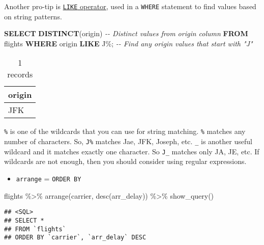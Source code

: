 \documentclass[
]{book}
\newenvironment{Shaded}{\begin{snugshade}}{\end{snugshade}}
\newcommand{\CommentTok}[1]{\textcolor[rgb]{0.56,0.35,0.01}{\textit{#1}}}
\newcommand{\FunctionTok}[1]{\textcolor[rgb]{0.00,0.00,0.00}{#1}}
\newcommand{\KeywordTok}[1]{\textcolor[rgb]{0.13,0.29,0.53}{\textbf{#1}}}
\newcommand{\NormalTok}[1]{#1}
\newcommand{\SpecialCharTok}[1]{\textcolor[rgb]{0.00,0.00,0.00}{#1}}
\newcommand{\StringTok}[1]{\textcolor[rgb]{0.31,0.60,0.02}{#1}}
\providecommand{\tightlist}{%
  \setlength{\itemsep}{0pt}\setlength{\parskip}{0pt}}
\begin{document}
Another pro-tip is \href{https://www.w3schools.com/sql/sql_like.asp}{\texttt{LIKE} operator}, used in a \texttt{WHERE} statement to find values based on string patterns.

\begin{Shaded}
\begin{Highlighting}[]
\KeywordTok{SELECT} \KeywordTok{DISTINCT}\NormalTok{(origin) }\CommentTok{{-}{-} Distinct values from origin column}
\KeywordTok{FROM}\NormalTok{ flights}
\KeywordTok{WHERE}\NormalTok{ origin }\KeywordTok{LIKE} \StringTok{\textquotesingle{}J\%\textquotesingle{}}\NormalTok{; }\CommentTok{{-}{-} Find any origin values that start with "J"}
\end{Highlighting}
\end{Shaded}

\begin{table}

\caption{\label{tab:unnamed-chunk-16}1 records}
\centering
\begin{tabular}[t]{l}
\hline
origin\\
\hline
JFK\\
\hline
\end{tabular}
\end{table}

\texttt{\%} is one of the wildcards that you can use for string matching. \texttt{\%} matches any number of characters. So, \texttt{J\%} matches Jae, JFK, Joseph, etc. \texttt{\_} is another useful wildcard and it matches exactly one character. So \texttt{J\_} matches only JA, JE, etc. If wildcards are not enough, then you should consider using regular expressions.

\begin{itemize}
\tightlist
\item
  \texttt{arrange} = \texttt{ORDER\ BY}
\end{itemize}

\begin{Shaded}
\begin{Highlighting}[]
\NormalTok{flights }\SpecialCharTok{\%\textgreater{}\%} 
  \FunctionTok{arrange}\NormalTok{(carrier, }\FunctionTok{desc}\NormalTok{(arr\_delay)) }\SpecialCharTok{\%\textgreater{}\%}
  \FunctionTok{show\_query}\NormalTok{()}
\end{Highlighting}
\end{Shaded}

\begin{verbatim}
## <SQL>
## SELECT *
## FROM `flights`
## ORDER BY `carrier`, `arr_delay` DESC
\end{verbatim}
\end{document}

